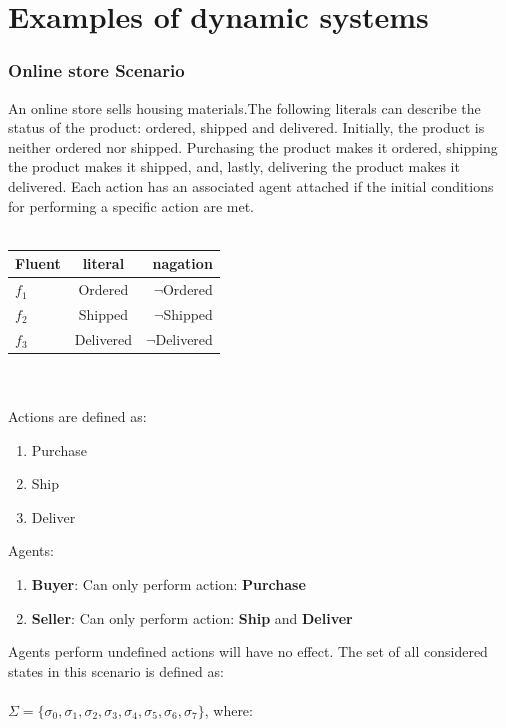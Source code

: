 \documentclass[a4paper]{article}
\begin{document}
\section{Examples of dynamic systems}
\subsubsection{Online store Scenario}
An online store sells housing materials.The following literals can describe the status of the product: ordered, shipped and delivered.
Initially, the product is neither ordered nor shipped. 
Purchasing the product makes it ordered, shipping the product makes it shipped, and, lastly, delivering the product makes it delivered. 
Each action has an associated agent attached if the initial conditions for performing a specific action are met. \\\\
\begin{tabular}{|l|c|r|}
\hline
\textbf{Fluent} & \textbf{literal} & \textbf{nagation} \\ \hline
$f_1$ & Ordered & $\neg$Ordered \\
$f_2$ & Shipped & $\neg$Shipped \\
$f_3$ & Delivered & $\neg$Delivered \\ \hline
\end{tabular} \\\\
Actions are defined as:
\begin{enumerate}
  \item Purchase
  \item Ship
  \item Deliver
\end{enumerate}
Agents:
\begin{enumerate}
  \item \textbf{Buyer}: Can only perform action: \textbf{Purchase}
  \item \textbf{Seller}: Can only perform action: \textbf{Ship} and \textbf{Deliver}
\end{enumerate}
Agents perform undefined actions will have no effect.
The set of all considered states in this scenario is defined as: \\\\
$\Sigma = \{{\sigma_0, \sigma_1, \sigma_2, \sigma_3, \sigma_4, \sigma_5, \sigma_6, \sigma_7\}}$, where:
\end{document}
